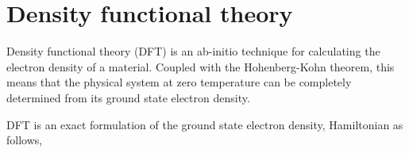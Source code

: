 
\section{Density functional theory}
\label{Sec:Theo:Dft}

Density functional theory (DFT) is an ab-initio technique for calculating the electron density of a material. Coupled with the Hohenberg-Kohn theorem, this means that the physical system at zero temperature can be completely determined from its ground state electron density.

DFT is an exact formulation of the ground state electron density,  Hamiltonian as follows,
